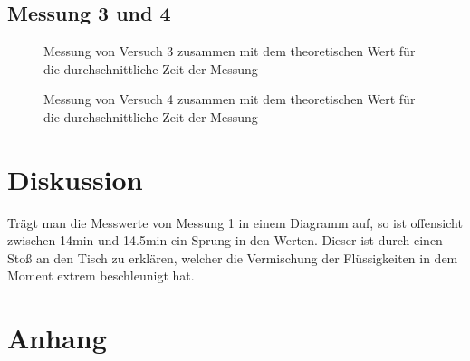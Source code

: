 \documentclass[12pt,a4paper,titlepage,headinclude,bibtotoc]{scrartcl}
\begin{document}
\subsection{Messung 3 und 4}
\begin{figure}[h!]
 \centering
 
 \caption{Messung von Versuch 3 zusammen mit dem theoretischen Wert für die durchschnittliche Zeit der Messung}
\end{figure}
\begin{figure}[h!]
 \centering
 
 \caption{Messung von Versuch 4 zusammen mit dem theoretischen Wert für die durchschnittliche Zeit der Messung}
\end{figure}

\section{Diskussion}
\label{sec:diskussion}
Trägt man die Messwerte von Messung 1 in einem Diagramm auf, so ist offensicht zwischen 14min und 14.5min ein Sprung in den Werten.
Dieser ist durch einen Stoß an den Tisch zu erklären, welcher die Vermischung der Flüssigkeiten in dem Moment extrem beschleunigt hat.


\section{Anhang}


\end{document}
